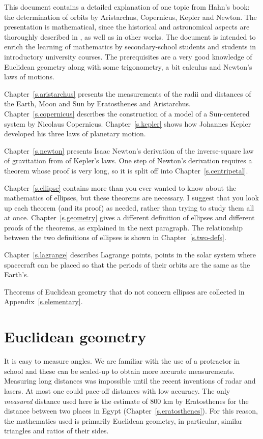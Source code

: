 This document contains a detailed explanation of one topic from Hahn's book: the determination of orbits by Aristarchus, Copernicus, Kepler and Newton. The presentation is mathematical, since the historical and astronomical aspects are thoroughly described in \cite{hahn-cic}, as well as in other works. The document is intended to enrich the learning of mathematics by secondary-school students and students in introductory university courses. The prerequisites are a very good knowledge of Euclidean geometry along with some trigonometry, a bit calculus and Newton's laws of motions.

Chapter~\ref{s.aristarchus} presents the measurements of the radii and distances of the Earth, Moon and Sun by Eratosthenes and Aristarchus. Chapter~\ref{s.copernicus} describes the construction of a model of a Sun-centered system by Nicolaus Copernicus. Chapter~\ref{s.kepler} shows how Johannes Kepler developed his three laws of planetary motion.

Chapter~\ref{s.newton} presents Isaac Newton's derivation of the inverse-square law of gravitation from of Kepler's laws. One step of Newton's derivation requires a theorem whose proof is very long, so it is split off into Chapter~\ref{s.centripetal}.

Chapter~\ref{s.ellipse} contains more than you ever wanted to know about the mathematics of ellipses, but these theorems are necessary. I suggest that you look up each theorem (and its proof) as needed, rather than trying to study them all at once. Chapter~\ref{s.geometry} gives a different definition of ellipses and different proofs of the theorems, as explained in the next paragraph. The relationship between the two definitions of ellipses is shown in Chapter~\ref{s.two-defs}.

Chapter~\ref{s.lagrange} describes Lagrange points, points in the solar system where spacecraft can be placed so that the periods of their orbits are the same as the Earth's.

Theorems of Euclidean geometry that do not concern ellipses are collected in Appendix~\ref{s.elementary}. 


\section*{Euclidean geometry}

It is easy to measure angles. We are familiar with the use of a protractor in school and these can be scaled-up to obtain more accurate measurements. Measuring long distances was impossible until the recent inventions of radar and lasers. At most one could pace-off distances with low accuracy. The only \emph{measured} distance used here is the estimate of $800$ km by Eratosthenes for the distance between two places in Egypt (Chapter~\ref{s.eratosthenes}). For this reason, the mathematics used is primarily Euclidean geometry, in particular, similar triangles and ratios of their sides.

